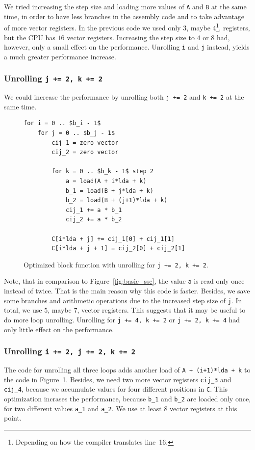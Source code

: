 \documentclass[12pt]{article}
\begin{document}
We tried increasing the step size and loading more values of \lstinline{A} and \lstinline{B} at the same time, in order to have less branches in the assembly code and to take advantage of more vector registers. In the previous code we used only $3$, maybe $4$\footnote{Depending on how the compiler translates line~16.}, registers, but the CPU has $16$ vector registers. Increasing the step size to $4$ or $8$ had, however, only a small effect on the performance. Unrolling \lstinline{i} and \lstinline{j} instead, yields a much greater performance increase.

\subsubsection{Unrolling \lstinline{j += 2, k += 2}}
We could increase the performance by unrolling both \lstinline{j += 2} and \lstinline{k += 2} at the same time.

\begin{figure}[H]
\begin{lstlisting}[mathescape]
for i = 0 .. $b_i - 1$
	for j = 0 .. $b_j - 1$
		cij_1 = zero vector
		cij_2 = zero vector

		for k = 0 .. $b_k - 1$ step 2
			a = load(A + i*lda + k)
			b_1 = load(B + j*lda + k)
			b_2 = load(B + (j+1)*lda + k)
			cij_1 += a * b_1
			cij_2 += a * b_2

		C[i*lda + j] += cij_1[0] + cij_1[1]
		C[i*lda + j + 1] = cij_2[0] + cij_2[1]
\end{lstlisting}
\caption{Optimized block function with unrolling for \lstinline{j += 2, k += 2}.}
\label{fig:opt_1_sse}
\end{figure}

Note, that in comparison to Figure~\ref{fig:basic_sse}, the value \lstinline{a} is read only once instead of twice. That is the main reason why this code is faster. Besides, we save some branches and arithmetic operations due to the increased step size of \lstinline{j}. In total, we use $5$, maybe $7$, vector registers. This suggests that it may be useful to do more loop unrolling. Unrolling for \lstinline{j += 4, k += 2} or \lstinline{j += 2, k += 4} had only little effect on the performance.

\subsubsection{Unrolling \lstinline{i += 2, j += 2, k += 2}}
The code for unrolling all three loops adds another load of \lstinline{A + (i+1)*lda + k} to the code in Figure~\ref{fig:opt_1_sse}. Besides, we need two more vector registers \lstinline{cij_3} and \lstinline{cij_4}, because we accumulate values for four different positions in \lstinline{C}. This optimization incrases the performance, because \lstinline{b_1} and \lstinline{b_2} are loaded only once, for two different values \lstinline{a_1} and \lstinline{a_2}. We use at least $8$ vector registers at this point.
\end{document}
